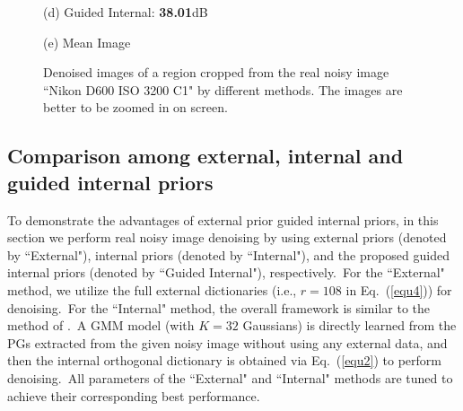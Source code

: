 \documentclass[10pt,twocolumn,letterpaper]{article}
\begin{document}
\begin{figure}
{\begin{minipage}[t]{0.195\textwidth}
{\footnotesize (d) Guided Internal: \textbf{38.01}dB }
\end{minipage}
\begin{minipage}[t]{0.195\textwidth}
\centering
{}
{\footnotesize (e) Mean Image \cite{crosschannel2016}}
\end{minipage}
}
\vspace{-2mm}  
\caption{Denoised images of a region cropped from the real noisy image ``Nikon D600 ISO 3200 C1" \cite{crosschannel2016} by different methods. The 
\vspace{-0.5mm}
images are better to be zoomed in on screen.}
\vspace{-3mm}
\label{fig5}
\end{figure}


\subsection{Comparison among external, internal and guided internal priors}

To demonstrate the advantages of external prior guided internal priors, in this section we perform real noisy image denoising by using external priors (denoted by ``External"), internal priors (denoted by ``Internal"), and the proposed guided internal priors (denoted by ``Guided Internal"), respectively.\ For the ``External" method, we utilize the full external dictionaries (i.e., $r=108$ in Eq.\ (\ref{equ4})) for denoising.\ For the ``Internal" method, the overall framework is similar to the method of \cite{ncsr}.\ A GMM model (with $K = 32$ Gaussians) is directly learned from the PGs extracted from the given noisy image without using any external data, and then the internal orthogonal dictionary is obtained via Eq.\ (\ref{equ2}) to perform denoising.\ All parameters of the ``External" and ``Internal" methods are tuned to achieve their corresponding best performance. 
\end{document}
